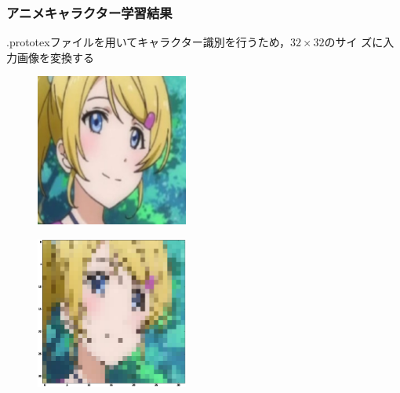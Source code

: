 \documentclass[dvipdfmx,11pt,notheorems]{beamer}
\theoremstyle{definition}
\begin{document}
\begin{frame}\frametitle{アニメキャラクター学習結果}
.prototexファイルを用いてキャラクター識別を行うため，$32\times 32$のサイ
ズに入力画像を変換する
\begin{figure}[t]
 \begin{minipage}{0.45\hsize}
  \centering
  \includegraphics[width=50mm]{./fig/eps/eri.eps} \\
 \end{minipage}
 \begin{minipage}{0.45\hsize}
  \centering
  \includegraphics[width=50mm]{./fig/eps/inputeri.eps}\\
 \end{minipage}
\end{figure}

\end{frame}
\end{document}
